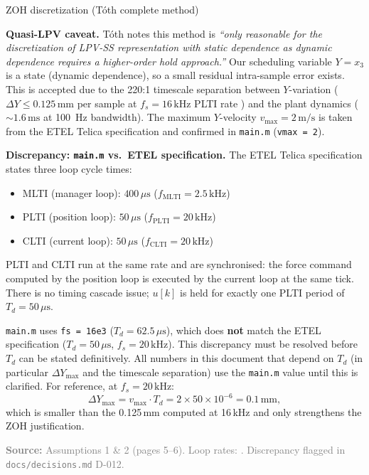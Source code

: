 \documentclass[11pt]{article}
\newcounter{derivstep}
\newenvironment{derivationstep}[1]
{
    \refstepcounter{derivstep}
    \begin{stepbox}{#1}
}
{
    \end{stepbox}
}
\newcommand{\sourcenote}[1]{%
    \par\vspace{0.4em}%
    \textcolor{gray}{\footnotesize\textbf{Source:} #1}%
}
\begin{document}
\begin{derivationstep}{ZOH discretization (Tóth complete method)}
\textbf{Quasi-LPV caveat.}
Tóth \cite{toth2010} notes this method is \emph{``only reasonable for the discretization of
LPV-SS representation with static dependence as dynamic dependence requires a higher-order
hold approach.''}
Our scheduling variable \(Y = x_3\) is a state (dynamic dependence), so a small residual
intra-sample error exists. This is accepted due to the 220:1 timescale separation between
\(Y\)-variation (\(\Delta Y \le 0.125\,\text{mm}\) per sample at \(f_s = 16\,\text{kHz}\)
PLTI rate \cite{etel_accuret}) and the plant dynamics (\(\sim\!1.6\,\text{ms}\) at 100~Hz bandwidth).
The maximum \(Y\)-velocity \(v_{\max} = 2\,\text{m/s}\) is taken from the ETEL Telica
specification \cite{etel_accuret} and confirmed in \texttt{main.m} (\texttt{vmax = 2}).

\textbf{Discrepancy: \texttt{main.m} vs.\ ETEL specification.}
The ETEL Telica specification \cite[p.~18]{etel_accuret} states three loop cycle times:
\begin{itemize}
    \item MLTI (manager loop): $400\,\mu\text{s}$ \quad ($f_\text{MLTI} = 2.5\,\text{kHz}$)
    \item PLTI (position loop): $50\,\mu\text{s}$ \quad ($f_\text{PLTI} = 20\,\text{kHz}$)
    \item CLTI (current loop): $50\,\mu\text{s}$ \quad ($f_\text{CLTI} = 20\,\text{kHz}$)
\end{itemize}
PLTI and CLTI run at the same rate and are synchronised: the force command computed by
the position loop is executed by the current loop at the same tick. There is no timing
cascade issue; $u[k]$ is held for exactly one PLTI period of $T_d = 50\,\mu\text{s}$.

\texttt{main.m} uses \texttt{fs = 16e3} ($T_d = 62.5\,\mu\text{s}$), which does
\textbf{not} match the ETEL specification ($T_d = 50\,\mu\text{s}$, $f_s = 20\,\text{kHz}$).
This discrepancy must be resolved before $T_d$ can be stated definitively. All numbers in
this document that depend on $T_d$ (in particular $\Delta Y_{\max}$ and the timescale
separation) use the \texttt{main.m} value until this is clarified. For reference, at
$f_s = 20\,\text{kHz}$:
\[
    \Delta Y_{\max} = v_{\max} \cdot T_d = 2 \times 50 \times 10^{-6} = 0.1\,\text{mm},
\]
which is smaller than the 0.125\,mm computed at 16\,kHz and only strengthens the ZOH
justification.

\sourcenote{\cite{toth2010} Assumptions 1 \& 2 (pages 5--6).
Loop rates: \cite[p.~18]{etel_accuret}.
Discrepancy flagged in \texttt{docs/decisions.md} D-012.}


\end{derivationstep}
\end{document}
